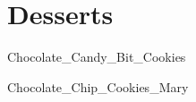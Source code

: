 \documentclass[9pt]{book}
\begin{document}
\chapter{Desserts}
\clearpage

\noindent
\begin{small}
{Chocolate_Candy_Bit_Cookies}
\end{small}

\begin{small}
{Chocolate_Chip_Cookies_Mary}
\end{small}

\backmatter
\end{document}
